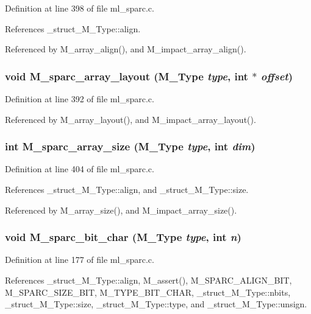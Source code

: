 Definition at line 398 of file ml\_\-sparc.c.

References \_\-struct\_\-M\_\-Type::align.

Referenced by M\_\-array\_\-align(), and M\_\-impact\_\-array\_\-align().
\subsubsection{\setlength{\rightskip}{0pt plus 5cm}void M\_\-sparc\_\-array\_\-layout (\bf{M\_\-Type} {\em type}, int $\ast$ {\em offset})}\label{m__sparc_8h_aec7f2b5b57fc133223631daab5ea784}




Definition at line 392 of file ml\_\-sparc.c.

Referenced by M\_\-array\_\-layout(), and M\_\-impact\_\-array\_\-layout().
\subsubsection{\setlength{\rightskip}{0pt plus 5cm}int M\_\-sparc\_\-array\_\-size (\bf{M\_\-Type} {\em type}, int {\em dim})}\label{m__sparc_8h_ff791473b06c0bc0575f73d005fce6c4}




Definition at line 404 of file ml\_\-sparc.c.

References \_\-struct\_\-M\_\-Type::align, and \_\-struct\_\-M\_\-Type::size.

Referenced by M\_\-array\_\-size(), and M\_\-impact\_\-array\_\-size().
\subsubsection{\setlength{\rightskip}{0pt plus 5cm}void M\_\-sparc\_\-bit\_\-char (\bf{M\_\-Type} {\em type}, int {\em n})}\label{m__sparc_8h_d4e647b1c70bb56b33aa6e6827d06068}




Definition at line 177 of file ml\_\-sparc.c.

References \_\-struct\_\-M\_\-Type::align, M\_\-assert(), M\_\-SPARC\_\-ALIGN\_\-BIT, M\_\-SPARC\_\-SIZE\_\-BIT, M\_\-TYPE\_\-BIT\_\-CHAR, \_\-struct\_\-M\_\-Type::nbits, \_\-struct\_\-M\_\-Type::size, \_\-struct\_\-M\_\-Type::type, and \_\-struct\_\-M\_\-Type::unsign.


